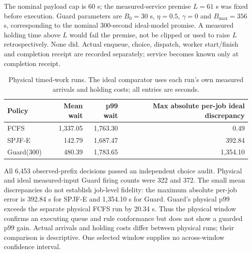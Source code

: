 \documentclass[mathematics,supfile,submit,moreauthors]{Definitions/mdpi}
\newcommand{\devnum}[1]{#1}
\begin{document}
The nominal payload cap is \devnum{60} s; the measured-service premise
$L=\devnum{61}$ s was fixed before execution. Guard parameters are
$B_0=\devnum{30}$ s, $\eta=\devnum{0.5}$, $\gamma=\devnum{0}$ and
$B_{\max}=\devnum{356}$ s, corresponding to the nominal
\devnum{300}-second ideal-model promise. A measured holding time above $L$ would
fail the premise, not be clipped or used to raise $L$ retrospectively. None did.
Actual enqueue, choice, dispatch, worker start/finish and completion receipt are
recorded separately; service becomes known only at completion receipt.

\begin{table}[htbp]
\centering\small
\caption{Physical timed-work runs. The ideal comparator uses each run's own measured
arrivals and holding costs; all entries are seconds.}
\label{tab:s_physical}
\begin{tabular}{lrrr}
\toprule
Policy & Mean wait & p99 wait & Max absolute per-job ideal discrepancy \\
\midrule
FCFS & \devnum{1{,}337.05} & \devnum{1{,}763.30} & \devnum{0.49} \\
SPJF-E & \devnum{142.79} & \devnum{1{,}687.47} & \devnum{392.84} \\
Guard(300) & \devnum{480.39} & \devnum{1{,}783.65} & \devnum{1{,}354.10} \\
\bottomrule
\end{tabular}
\end{table}


All \devnum{6{,}453} observed-prefix decisions passed an independent choice audit.
Physical and ideal measured-input Guard firing counts were \devnum{322} and
\devnum{372}. The small mean discrepancies do not establish job-level fidelity:
the maximum absolute per-job error is \devnum{392.84} s for SPJF-E and
\devnum{1{,}354.10} s for Guard. Guard's physical p99 exceeds the separate physical
FCFS run by \devnum{20.34} s. Thus the physical window confirms an executing
queue and rule conformance but does not show a guarded p99 gain. Actual arrivals
and holding costs differ between physical runs; their comparison is descriptive.
One selected window supplies no across-window confidence interval.
\end{document}
